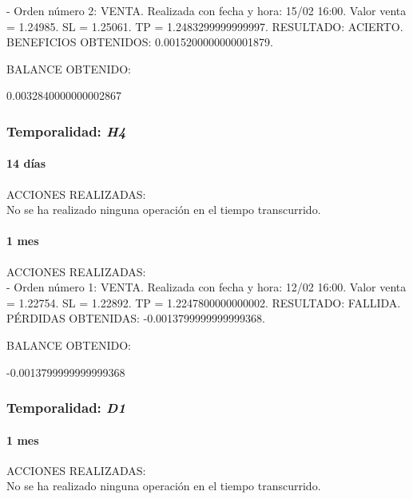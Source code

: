 - Orden número 2: VENTA. Realizada con fecha y hora: 15/02 16:00. Valor venta = 1.24985. SL = 1.25061. TP = 1.2483299999999997. RESULTADO: ACIERTO. BENEFICIOS OBTENIDOS: 0.0015200000000001879.\newline

\color{blue}
BALANCE OBTENIDO:\newline

0.0032840000000002867\newline
\color{black}
\subsubsection{Temporalidad: \textit{H4}}

\paragraph{14 días}

ACCIONES REALIZADAS:\\

No se ha realizado ninguna operación en el tiempo transcurrido.

\paragraph{1 mes}

ACCIONES REALIZADAS:\\

- Orden número 1: VENTA. Realizada con fecha y hora: 12/02 16:00. Valor venta = 1.22754. SL = 1.22892. TP = 1.2247800000000002. RESULTADO: FALLIDA. PÉRDIDAS OBTENIDAS: -0.0013799999999999368.\newline

\color{blue}
BALANCE OBTENIDO:\newline

-0.0013799999999999368\newline
\color{black}

\subsubsection{Temporalidad: \textit{D1}}

\paragraph{1 mes}

ACCIONES REALIZADAS:\\

No se ha realizado ninguna operación en el tiempo transcurrido.

